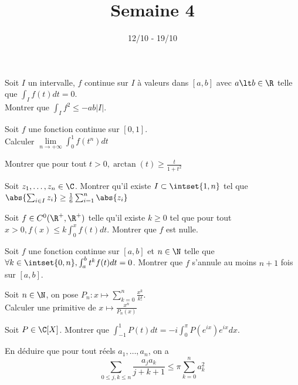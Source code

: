 \documentclass[11pt,a4paper]{article}
\begin{document}
\title{Semaine 4}
\author{}
\date{12/10 - 19/10 }

\maketitle


\begin{exercise}
Soit $I$ un intervalle, $f$ continue sur $I$ à valeurs dans $[a,b]$ avec $a\lt b\in\R$ telle que $\int_I f(t)dt=0$.\\
Montrer que $\displaystyle\int_If^2\le-ab|I|$.
\end{exercise}

\begin{exercise}
Soit $f$ une fonction continue sur $[0,1]$.\\
Calculer $\lim\limits_{n\to+\infty}\int_0^1f(t^n)dt$
\end{exercise}

\begin{exercise}
Montrer que pour tout $t\gt0, \arctan(t)\ge\frac{t}{1+t^2}$
\end{exercise}

\begin{exercise}
Soit $z_1,\ldots, z_n\in\C$. Montrer qu'il existe $I\subset\intset{1,n}$ tel que $\abs{\sum_{i\in I}z_i}\ge\frac{1}{6}\sum_{i=1}^n\abs{z_i}$
\end{exercise}

\begin{exercise}
Soit $f\in C^0(\R^+,\R^+)$ telle qu'il existe $k\ge0$ tel que pour tout $x\gt0, f(x)\le k\int_0^xf(t)dt$.
Montrer que $f$ est nulle.
\end{exercise}

\begin{exercise}
Soit $f$ une fonction continue sur $[a,b]$ et $n\in\N$ telle que $\forall k\in\intset{0,n},\int_a^bt^kf(t)dt=0$.
Montrer que $f$ s'annule au moins $n+1$ fois sur $[a,b]$.
\end{exercise}

\begin{exercise}
Soit $n\in\N$, on pose $P_n:x\mapsto\sum_{k=0}^n\frac{x^k}{k!}$.\\
Calculer une primitive de $x\mapsto\frac{x^n}{P_n(x)}$
\end{exercise}

\begin{exercise}
\begin{questions}
\item Soit $P\in\C[X]$. Montrer que $\int_{-1}^1P(t)dt=-i\int_0^{\pi}P(e^{ix})e^{ix}dx$.
\item En déduire que pour tout réels $a_1,\ldots,a_n$, on a
$$\sum_{0\le j,k\le n}\frac{a_ja_k}{j+k+1}\le\pi\sum_{k=0}^na_k^2$$
\end{questions}
\end{exercise}
\end{document}
